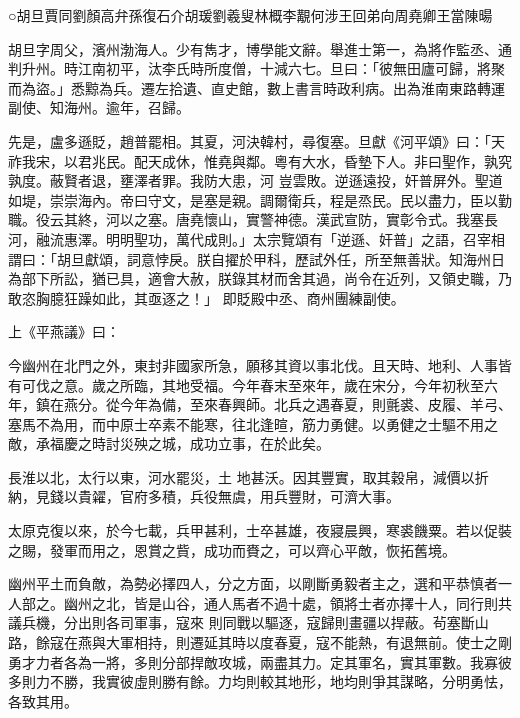 
\begin{pinyinscope}

 ○胡旦賈同劉顏高弁孫復石介胡瑗劉羲叟林概李覯何涉王回弟向周堯卿王當陳暘



 胡旦字周父，濱州渤海人。少有雋才，博學能文辭。舉進士第一，為將作監丞、通判升州。時江南初平，汰李氏時所度僧，十減六七。旦曰：「彼無田廬可歸，將聚而為盜。」悉黥為兵。遷左拾遺、直史館，數上書言時政利病。出為淮南東路轉運副使、知海州。逾年，召歸。



 先是，盧多遜貶，趙普罷相。其夏，河決韓村，尋復塞。旦獻《河平頌》曰：「天祚我宋，以君兆民。配天成休，惟堯與鄰。粵有大水，昏墊下人。非曰聖作，孰究孰度。蔽賢者退，壅澤者罪。我防大患，河
 豈雲敗。逆遜遠投，奸普屏外。聖道如堤，崇崇海內。帝曰守文，是塞是親。調爾衛兵，程是烝民。民以盡力，臣以勤職。役云其終，河以之塞。唐堯懷山，實警神德。漢武宣防，實彰令式。我塞長河，融流惠澤。明明聖功，萬代成則。」太宗覽頌有「逆遜、奸普」之語，召宰相謂曰：「胡旦獻頌，詞意悖戾。朕自擢於甲科，歷試外任，所至無善狀。知海州日為部下所訟，猶已具，適會大赦，朕錄其材而舍其過，尚令在近列，又領史職，乃敢恣胸臆狂躁如此，其亟逐之！」
 即貶殿中丞、商州團練副使。



 上《平燕議》曰：



 今幽州在北門之外，東封非國家所急，願移其資以事北伐。且天時、地利、人事皆有可伐之意。歲之所臨，其地受福。今年春末至來年，歲在宋分，今年初秋至六年，鎮在燕分。從今年為備，至來春興師。北兵之遇春夏，則氈裘、皮履、羊弓、塞馬不為用，而中原士卒素不能寒，往北逢暄，筋力勇健。以勇健之士驅不用之敵，承福慶之時討災殃之城，成功立事，在於此矣。



 長淮以北，太行以東，河水罷災，土
 地甚沃。因其豐實，取其穀帛，減價以折納，見錢以貴糴，官府多積，兵役無虞，用兵豐財，可濟大事。



 太原克復以來，於今七載，兵甲甚利，士卒甚雄，夜寢晨興，寒裘饑粟。若以促裝之賜，發軍而用之，恩賞之貲，成功而賚之，可以齊心平敵，恢拓舊境。



 幽州平土而負敵，為勢必擇四人，分之方面，以剛斷勇毅者主之，選和平恭慎者一人部之。幽州之北，皆是山谷，通人馬者不過十處，領將士者亦擇十人，同行則共議兵機，分出則各司軍事，寇來
 則同戰以驅逐，寇歸則畫疆以捍蔽。茍塞斷山路，餘寇在燕與大軍相持，則遷延其時以度春夏，寇不能熱，有退無前。使士之剛勇才力者各為一將，多則分部捍敵攻城，兩盡其力。定其軍名，實其軍數。我寡彼多則力不勝，我實彼虛則勝有餘。力均則較其地形，地均則爭其謀略，分明勇怯，各致其用。




\end{pinyinscope}
